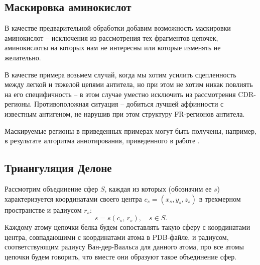 
\subsection{Маскировка аминокислот}
В качестве предварительной обработки добавим возможность маскировки аминокислот -- исключения из рассмотрения тех фрагментов цепочек, аминокислоты на которых нам не интересны или которые изменять не желательно. 

В качестве примера возьмем случай, когда мы хотим усилить сцепленность между легкой и тяжелой цепями антитела, но при этом не хотим никак повлиять на его специфичность -- в этом случае уместно исключить из рассмотрения CDR-регионы. Противоположная ситуация -- добиться лучшей аффинности с известным антигеном, не нарушив при этом структуру FR-регионов антитела.

Маскируемые регионы в приведенных примерах могут быть получены, например, в результате алгоритма аннотирования, приведенного в работе \cite{yakovlev2014}.

\subsection{Триангуляция Делоне}
Рассмотрим объединение сфер $S$, каждая из которых (обозначим ее $s$) характеризуется координатами своего центра $c_s=(x_s, y_s, z_s)$ в трехмерном пространстве и радиусом $r_s$:
$$
s=s(c_s,\,r_s),\quad s\in S.
$$
Каждому атому цепочки белка будем сопоставлять такую сферу с координатами центра, совпадающими с координатами атома в PDB-файле, и радиусом, соответствующим радиусу Ван-дер-Ваальса для данного атома, про все атомы цепочки будем говорить, что вместе они образуют такое объединение сфер.


